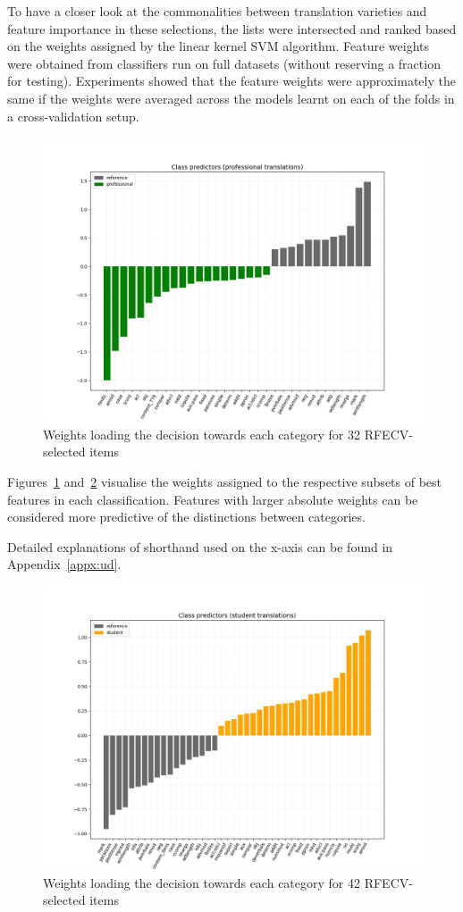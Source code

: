 To have a closer look at the commonalities between translation varieties and feature importance in these selections, the lists were intersected and ranked based on the weights assigned by the linear kernel SVM algorithm. Feature weights were obtained from classifiers run on full datasets (without reserving a fraction for testing). Experiments showed that the feature weights were approximately the same if the weights were averaged across the models learnt on each of the folds in a cross-validation setup.

\vspace{-2em}
\begin{figure}[H]
	\centering
	\includegraphics[width=.85\linewidth]{figures/pro-ref-bars-ud33}
	\caption{\label{fig:pro-weights}Weights loading the decision towards each category for 32 RFECV-selected items}	
\end{figure}

Figures~\ref{fig:pro-weights} and~\ref{fig:stu-weights} visualise the weights assigned to the respective subsets of best features in each classification. Features with larger absolute weights can be considered more predictive of the distinctions between categories. 

Detailed explanations of shorthand used on the x-axis can be found in Appendix~\ref{appx:ud}.

\vspace{-2em}
\begin{figure}[H]
	\centering
	\includegraphics[width=.85\linewidth]{figures/stu-ref-bars-ud42}
	\caption{\label{fig:stu-weights}Weights loading the decision towards each category for 42 RFECV-selected items}	
\end{figure}

